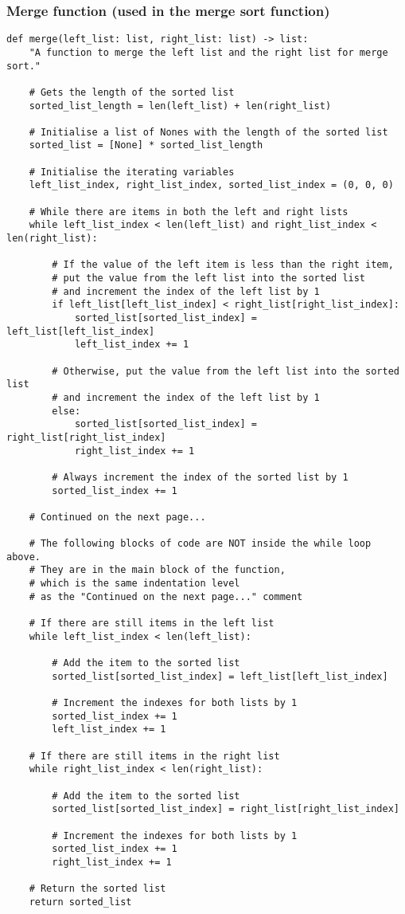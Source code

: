 \documentclass[11pt]{article}
\begin{document}
\subsubsection{Merge function (used in the merge sort function)}
\label{sec:org710a326}
\begin{verbatim}
def merge(left_list: list, right_list: list) -> list:
    "A function to merge the left list and the right list for merge sort."

    # Gets the length of the sorted list
    sorted_list_length = len(left_list) + len(right_list)

    # Initialise a list of Nones with the length of the sorted list
    sorted_list = [None] * sorted_list_length

    # Initialise the iterating variables
    left_list_index, right_list_index, sorted_list_index = (0, 0, 0)

    # While there are items in both the left and right lists
    while left_list_index < len(left_list) and right_list_index < len(right_list):

        # If the value of the left item is less than the right item,
        # put the value from the left list into the sorted list
        # and increment the index of the left list by 1
        if left_list[left_list_index] < right_list[right_list_index]:
            sorted_list[sorted_list_index] = left_list[left_list_index]
            left_list_index += 1

        # Otherwise, put the value from the left list into the sorted list
        # and increment the index of the left list by 1
        else:
            sorted_list[sorted_list_index] = right_list[right_list_index]
            right_list_index += 1

        # Always increment the index of the sorted list by 1
        sorted_list_index += 1

    # Continued on the next page...

    # The following blocks of code are NOT inside the while loop above.
    # They are in the main block of the function,
    # which is the same indentation level
    # as the "Continued on the next page..." comment

    # If there are still items in the left list
    while left_list_index < len(left_list):

        # Add the item to the sorted list
        sorted_list[sorted_list_index] = left_list[left_list_index]

        # Increment the indexes for both lists by 1
        sorted_list_index += 1
        left_list_index += 1

    # If there are still items in the right list
    while right_list_index < len(right_list):

        # Add the item to the sorted list
        sorted_list[sorted_list_index] = right_list[right_list_index]

        # Increment the indexes for both lists by 1
        sorted_list_index += 1
        right_list_index += 1

    # Return the sorted list
    return sorted_list
\end{verbatim}
\end{document}
